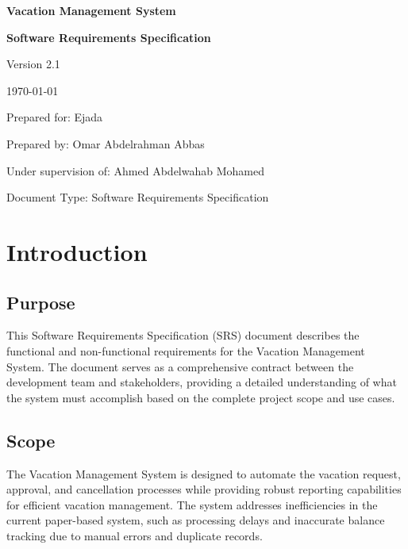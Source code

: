 \documentclass[12pt,a4paper]{article}
\begin{document}
\begin{titlepage}
\centering
\vspace*{2cm}
{\Huge\bfseries Vacation Management System\par}
\vspace{1cm}
{\Large\bfseries Software Requirements Specification\par}
\vspace{2cm}
{\large Version 2.1\par}
\vspace{1cm}
{\large \today\par}
\vspace{2cm}
{\large Prepared for: Ejada\par}
\vspace{1cm}
{\large Prepared by: Omar Abdelrahman Abbas\par}
\vspace{1cm}
{\large Under supervision of: Ahmed Abdelwahab Mohamed\par}
\vspace{1cm}
{\large Document Type: Software Requirements Specification\par}
\vfill
\end{titlepage}

\tableofcontents
\newpage

\listoffigures
\newpage

\listoftables
\newpage

\section{Introduction}

\subsection{Purpose}
This Software Requirements Specification (SRS) document describes the functional and non-functional requirements for the Vacation Management System. The document serves as a comprehensive contract between the development team and stakeholders, providing a detailed understanding of what the system must accomplish based on the complete project scope and use cases.

\subsection{Scope}
The Vacation Management System is designed to automate the vacation request, approval, and cancellation processes while providing robust reporting capabilities for efficient vacation management. The system addresses inefficiencies in the current paper-based system, such as processing delays and inaccurate balance tracking due to manual errors and duplicate records.
\end{document}
